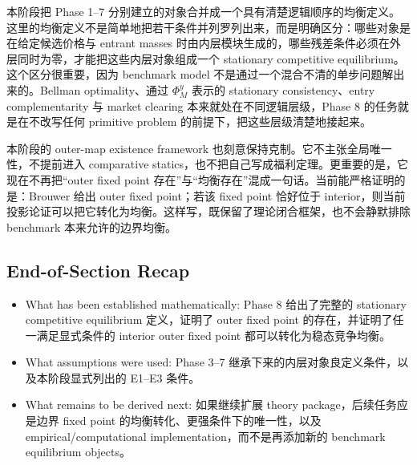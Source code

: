 本阶段把 Phase 1--7 分别建立的对象合并成一个具有清楚逻辑顺序的均衡定义。这里的均衡定义不是简单地把若干条件并列罗列出来，而是明确区分：哪些对象是在给定候选价格与 entrant masses 时由内层模块生成的，哪些残差条件必须在外层同时为零，才能把这些内层对象组成一个 stationary competitive equilibrium。这个区分很重要，因为 benchmark model 不是通过一个混合不清的单步问题解出来的。Bellman optimality、通过 $\Phi_M^y$ 表示的 stationary consistency、entry complementarity 与 market clearing 本来就处在不同逻辑层级，Phase 8 的任务就是在不改写任何 primitive problem 的前提下，把这些层级清楚地接起来。

本阶段的 outer-map existence framework 也刻意保持克制。它不主张全局唯一性，不提前进入 comparative statics，也不把自己写成福利定理。更重要的是，它现在不再把“outer fixed point 存在”与“均衡存在”混成一句话。当前能严格证明的是：Brouwer 给出 outer fixed point；若该 fixed point 恰好位于 interior，则当前投影论证可以把它转化为均衡。这样写，既保留了理论闭合框架，也不会静默排除 benchmark 本来允许的边界均衡。

\subsection*{End-of-Section Recap}

\begin{itemize}
    \item What has been established mathematically: Phase 8 给出了完整的 stationary competitive equilibrium 定义，证明了 outer fixed point 的存在，并证明了任一满足显式条件的 interior outer fixed point 都可以转化为稳态竞争均衡。
    \item What assumptions were used: Phase 3--7 继承下来的内层对象良定义条件，以及本阶段显式列出的 E1--E3 条件。
    \item What remains to be derived next: 如果继续扩展 theory package，后续任务应是边界 fixed point 的均衡转化、更强条件下的唯一性，以及 empirical/computational implementation，而不是再添加新的 benchmark equilibrium objects。
\end{itemize}
